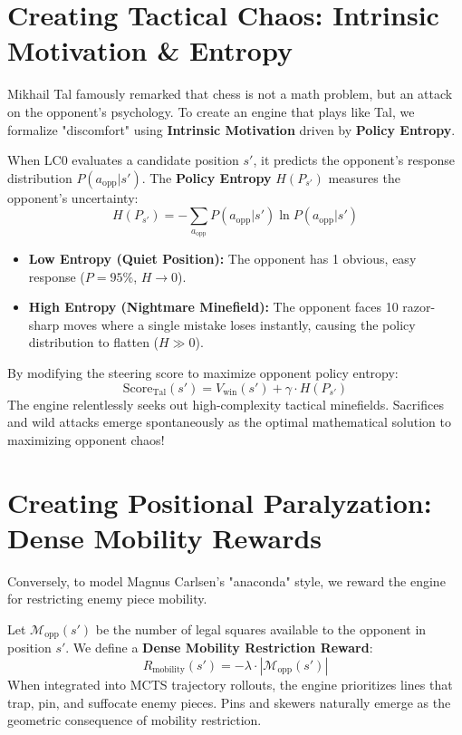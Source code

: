 \documentclass[11pt,a4paper]{report}
\begin{document}
\section{Creating Tactical Chaos: Intrinsic Motivation \& Entropy}
Mikhail Tal famously remarked that chess is not a math problem, but an attack on the opponent's psychology. To create an engine that plays like Tal, we formalize "discomfort" using \textbf{Intrinsic Motivation} driven by \textbf{Policy Entropy}.

When LC0 evaluates a candidate position $s'$, it predicts the opponent's response distribution $P(a_{\text{opp}}|s')$. The \textbf{Policy Entropy} $H(P_{s'})$ measures the opponent's uncertainty:
\begin{equation}
H(P_{s'}) = - \sum_{a_{\text{opp}}} P(a_{\text{opp}}|s') \ln P(a_{\text{opp}}|s')
\end{equation}
\begin{itemize}
    \item \textbf{Low Entropy (Quiet Position):} The opponent has 1 obvious, easy response ($P = 95\%$, $H \to 0$).
    \item \textbf{High Entropy (Nightmare Minefield):} The opponent faces 10 razor-sharp moves where a single mistake loses instantly, causing the policy distribution to flatten ($H \gg 0$).
\end{itemize}

By modifying the steering score to maximize opponent policy entropy:
\begin{equation}
\text{Score}_{\text{Tal}}(s') = V_{\text{win}}(s') + \gamma \cdot H(P_{s'})
\end{equation}
The engine relentlessly seeks out high-complexity tactical minefields. Sacrifices and wild attacks emerge spontaneously as the optimal mathematical solution to maximizing opponent chaos!

\section{Creating Positional Paralyzation: Dense Mobility Rewards}
Conversely, to model Magnus Carlsen's "anaconda" style, we reward the engine for restricting enemy piece mobility.

Let $\mathcal{M}_{\text{opp}}(s')$ be the number of legal squares available to the opponent in position $s'$. We define a \textbf{Dense Mobility Restriction Reward}:
\begin{equation}
R_{\text{mobility}}(s') = - \lambda \cdot |\mathcal{M}_{\text{opp}}(s')|
\end{equation}
When integrated into MCTS trajectory rollouts, the engine prioritizes lines that trap, pin, and suffocate enemy pieces. Pins and skewers naturally emerge as the geometric consequence of mobility restriction.
\end{document}
